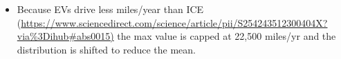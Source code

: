\begin{itemize}
\item Because EVs drive less miles/year than ICE (\href{https://www.sciencedirect.com/science/article/pii/S254243512300404X?via\%3Dihub#abs0015),}{https://www.sciencedirect.com/science/article/pii/S254243512300404X?via\%3Dihub#abs0015)} the max value is capped at 22,500 miles/yr and the distribution is shifted to reduce the mean.
\end{itemize}
